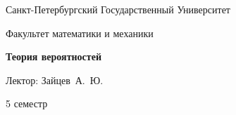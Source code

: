 \begin{titlepage}
	\centering
	
	{\Large Санкт-Петербургский Государственный Университет \par}
	
	\vspace{0.5cm}
	
	{\large Факультет математики и механики\par}
	
	\vspace{7.5cm}
	
	{\Huge\bfseries Теория вероятностей} %

        \vspace{0.3cm}
	
        {\large Лектор: Зайцев~А.~Ю.}
        
        \vspace{1cm}
        
        {\Large 5 семестр}


\end{titlepage}